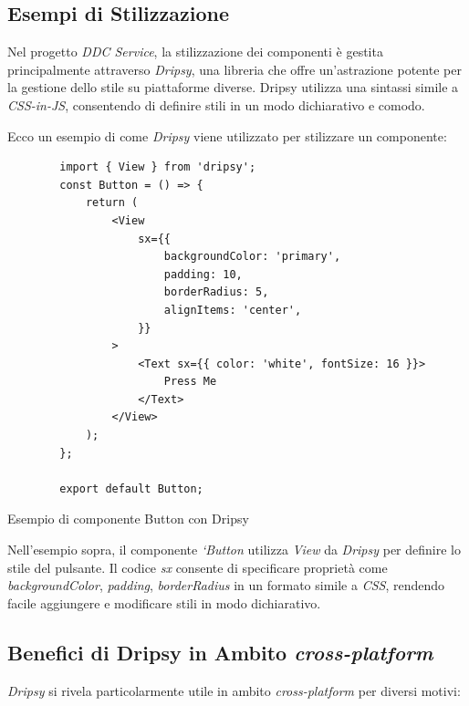 \subsection{Esempi di Stilizzazione}

Nel progetto \textit{DDC Service}, la stilizzazione dei componenti è gestita principalmente attraverso \textit{Dripsy},
 una libreria che offre un'astrazione potente per la gestione dello stile su piattaforme diverse.
 Dripsy utilizza una sintassi simile a \textit{CSS-in-JS}, consentendo di definire stili in un modo dichiarativo e comodo.

Ecco un esempio di come \textit{Dripsy} viene utilizzato per stilizzare un componente:

\begin{listing}[H]
    \begin{verbatim}
        import { View } from 'dripsy';
        const Button = () => {
            return (
                <View
                    sx={{
                        backgroundColor: 'primary',
                        padding: 10,
                        borderRadius: 5,
                        alignItems: 'center',
                    }}
                >
                    <Text sx={{ color: 'white', fontSize: 16 }}>
                        Press Me
                    </Text>
                </View>
            );
        };

        export default Button;
    \end{verbatim}
    \caption{Esempio di componente Button con Dripsy}
    \label{listing:dripsy_button}
\end{listing}

Nell'esempio sopra, il componente \textit{`Button} utilizza \textit{View} da \textit{Dripsy} per definire lo stile del pulsante. 
Il codice \textit{sx} consente di specificare proprietà come \textit{backgroundColor}, \textit{padding}, \textit{borderRadius} in un formato simile a \textit{CSS}, 
rendendo facile aggiungere e modificare stili in modo dichiarativo.

\pagebreak
\subsection{Benefici di Dripsy in Ambito \textit{cross-platform}}

\textit{Dripsy} si rivela particolarmente utile in ambito \textit{cross-platform} per diversi motivi:

